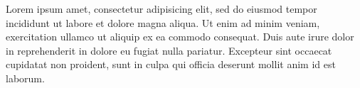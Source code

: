 \documentclass{article}
\begin{document}
\TestTitleDesc{}
{}

Lorem ipsum  amet, consectetur adipisicing elit, sed do
eiusmod tempor incididunt ut labore et dolore magna aliqua. Ut enim ad
minim veniam,  exercitation ullamco  ut aliquip ex ea commodo consequat. Duis aute irure dolor in
reprehenderit in  dolore eu fugiat
nulla pariatur. Excepteur sint occaecat cupidatat non proident, sunt in
culpa qui officia deserunt mollit anim id est laborum.
\end{document}
